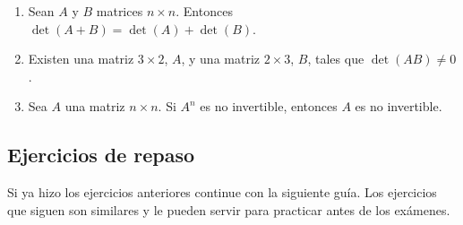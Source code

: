 \documentclass[a4paper,12pt,twoside,spanish,reqno]{amsbook}
\numberwithin{equation}{section}
\begin{document}
\begin{enumerate}
\begin{enumerate}
\item Sean $A$ y $B$ matrices $n \times n$. Entonces $\det(A + B) = \det (A) + \det(B)$.


\item Existen una matriz $3\times 2$, $A$, y una matriz $2\times 3$, $B$, tales que $\det(AB) \neq 0$.


\item Sea $A$ una matriz $n\times n$. Si $A^n$ es no invertible, entonces $A$ es no invertible.
\end{enumerate}




\end{enumerate}



\subsection*{Ejercicios de repaso}
Si ya hizo los ejercicios anteriores continue con la siguiente guía. Los ejercicios que siguen son similares y le pueden servir para practicar antes de los exámenes.

\
\end{document}

